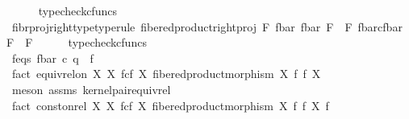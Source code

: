 \begin{isabellebody}
\ \ \ \ \isamarkupfalse%
\ typecheck{\isacharunderscore}{\kern0pt}cfuncs\isanewline
\ \ \isamarkupfalse%
\ fibr{\isacharunderscore}{\kern0pt}proj{\isacharunderscore}{\kern0pt}right{\isacharunderscore}{\kern0pt}type{\isacharbrackleft}{\kern0pt}type{\isacharunderscore}{\kern0pt}rule{\isacharbrackright}{\kern0pt}{\isacharcolon}{\kern0pt}\ {\isachardoublequoteopen}fibered{\isacharunderscore}{\kern0pt}product{\isacharunderscore}{\kern0pt}right{\isacharunderscore}{\kern0pt}proj\ F\ {\isacharparenleft}{\kern0pt}f{\isacharunderscore}{\kern0pt}bar{\isacharparenright}{\kern0pt}\ {\isacharparenleft}{\kern0pt}f{\isacharunderscore}{\kern0pt}bar{\isacharparenright}{\kern0pt}\ F\ {\isacharcolon}{\kern0pt}\ F\ \isactrlbsub {\isacharparenleft}{\kern0pt}f{\isacharunderscore}{\kern0pt}bar{\isacharparenright}{\kern0pt}\isactrlesub {\isasymtimes}\isactrlsub c\isactrlbsub {\isacharparenleft}{\kern0pt}f{\isacharunderscore}{\kern0pt}bar{\isacharparenright}{\kern0pt}\isactrlesub \ F\ {\isasymrightarrow}\ F{\isachardoublequoteclose}\isanewline
\ \ \ \ \isamarkupfalse%
\ typecheck{\isacharunderscore}{\kern0pt}cfuncs\isanewline
\ \ \isanewline
\ \ \isanewline
\ \ \ \ \isanewline
\ \ \ \ \isanewline
\ \ \ \ \isanewline
\ \ \ \ \isanewline
\ \ \ \ \isanewline
\ \ \ \ \isanewline
\ \ \ \ \isanewline
\ \ \isanewline
\ \ \isamarkupfalse%
\ f{\isacharunderscore}{\kern0pt}eqs{\isacharcolon}{\kern0pt}\ {\isachardoublequoteopen}f{\isacharunderscore}{\kern0pt}bar\ {\isasymcirc}\isactrlsub c\ q\ {\isacharequal}{\kern0pt}\ f{\isachardoublequoteclose}\isanewline
\ \ \ \ \isamarkupfalse%
\ {\isacharminus}{\kern0pt}\ \isanewline
\ \ \ \ \ \ \isamarkupfalse%
\ fact{}{\isacharcolon}{\kern0pt}\ {\isachardoublequoteopen}equiv{\isacharunderscore}{\kern0pt}rel{\isacharunderscore}{\kern0pt}on\ X\ {\isacharparenleft}{\kern0pt}X\ \isactrlbsub f\isactrlesub {\isasymtimes}\isactrlsub c\isactrlbsub f\isactrlesub \ X{\isacharcomma}{\kern0pt}\ fibered{\isacharunderscore}{\kern0pt}product{\isacharunderscore}{\kern0pt}morphism\ X\ f\ f\ X{\isacharparenright}{\kern0pt}{\isachardoublequoteclose}\isanewline
\ \ \ \ \ \ \ \ \isamarkupfalse%
\ {\isacharparenleft}{\kern0pt}meson\ assms{\isacharparenleft}{\kern0pt}{}{\isacharparenright}{\kern0pt}\ kernel{\isacharunderscore}{\kern0pt}pair{\isacharunderscore}{\kern0pt}equiv{\isacharunderscore}{\kern0pt}rel{\isacharparenright}{\kern0pt}\isanewline
\ \ \ \ \ \ \isamarkupfalse%
\ fact{}{\isacharcolon}{\kern0pt}\ {\isachardoublequoteopen}const{\isacharunderscore}{\kern0pt}on{\isacharunderscore}{\kern0pt}rel\ X\ {\isacharparenleft}{\kern0pt}X\ \isactrlbsub f\isactrlesub {\isasymtimes}\isactrlsub c\isactrlbsub f\isactrlesub \ X{\isacharcomma}{\kern0pt}\ fibered{\isacharunderscore}{\kern0pt}product{\isacharunderscore}{\kern0pt}morphism\ X\ f\ f\ X{\isacharparenright}{\kern0pt}\ f{\isachardoublequoteclose}\isanewline

\end{isabellebody}
